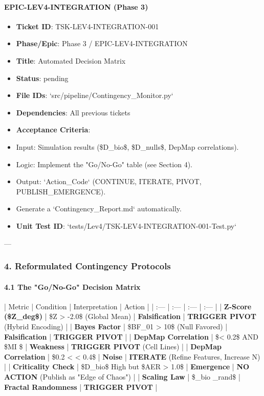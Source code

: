 \documentclass{article}
\begin{document}
\paragraph{EPIC-LEV4-INTEGRATION (Phase 3)}

\begin{itemize}
\item   \textbf{Ticket ID}: TSK-LEV4-INTEGRATION-001
\item   \textbf{Phase/Epic}: Phase 3 / EPIC-LEV4-INTEGRATION
\item   \textbf{Title}: Automated Decision Matrix
\item   \textbf{Status}: pending
\item   \textbf{File IDs}: `src/pipeline/Contingency\_Monitor.py`
\item   \textbf{Dependencies}: All previous tickets
\item   \textbf{Acceptance Criteria}:
\item   Input: Simulation results (\$D\_{bio}\$, \$D\_{nulls}\$, DepMap correlations).
\item   Logic: Implement the "Go/No-Go" table (see Section 4).
\item   Output: `Action\_Code` (CONTINUE, ITERATE, PIVOT, PUBLISH\_EMERGENCE).
\item   Generate a `Contingency\_Report.md` automatically.
\item   \textbf{Unit Test ID}: `tests/Lev4/TSK-LEV4-INTEGRATION-001-Test.py`
\end{itemize}

---

\subsubsection{4. Reformulated Contingency Protocols}

\paragraph{4.1 The "Go/No-Go" Decision Matrix}

| Metric | Condition | Interpretation | Action |
| :--- | :--- | :--- | :--- |
| \textbf{Z-Score (\$Z\_{deg}\$)} | \$Z > -2.0\$ (Global Mean) | \textbf{Falsification} | \textbf{TRIGGER PIVOT} (Hybrid Encoding) |
| \textbf{Bayes Factor} | \$BF\_{01} > 10\$ (Null Favored) | \textbf{Falsification} | \textbf{TRIGGER PIVOT} |
| \textbf{DepMap Correlation} | \$\rho < 0.2\$ AND \$MI \$ | \textbf{Weakness} | \textbf{TRIGGER PIVOT} (Cell Lines) |
| \textbf{DepMap Correlation} | \$0.2 < \rho < 0.4\$ | \textbf{Noise} | \textbf{ITERATE} (Refine Features, Increase N) |
| \textbf{Criticality Check} | \$D\_{bio}\$ High but \$AER > 1.0\$ | \textbf{Emergence} | \textbf{NO ACTION} (Publish as "Edge of Chaos") |
| \textbf{Scaling Law} | \$\alpha\_{bio} \approx \alpha\_{rand}\$ | \textbf{Fractal Randomness} | \textbf{TRIGGER PIVOT} |
\end{document}
